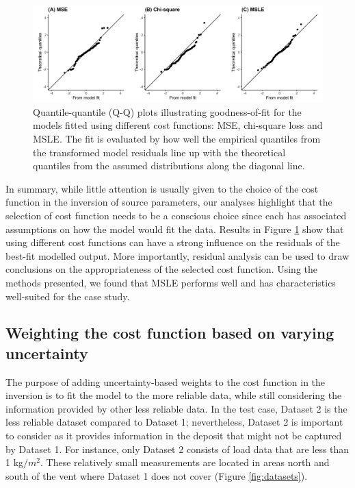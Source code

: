 \documentclass[a4paper,fleqn]{cas-sc}
\begin{document}
    \begin{figure}[tbp]
    \centering
    \includegraphics[width=\linewidth]{Figures/fig5_qq-plots.png}
    \caption{Quantile-quantile (Q-Q) plots illustrating goodness-of-fit for the models fitted using different cost functions: MSE, chi-square loss and MSLE. The fit is evaluated by how well the empirical quantiles from the transformed model residuals line up with the theoretical quantiles from the assumed distributions along the diagonal line.}
    \label{fig:gaussian_qq}
    \end{figure}

In summary, while little attention is usually given to the choice of the cost function in the inversion of source parameters, our analyses highlight that the selection of cost function needs to be a conscious choice since each has associated assumptions on how the model would fit the data. Results in Figure \ref{fig:gaussian_qq} show that using different cost functions can have a strong influence on the residuals of the best-fit modelled output. More importantly, residual analysis can be used to draw conclusions on the appropriateness of the selected cost function. Using the methods presented, we found that MSLE performs well and has characteristics well-suited for the case study. 

\subsection{Weighting the cost function based on varying uncertainty} \label{subsection-varuncert}

The purpose of adding uncertainty-based weights to the cost function in the inversion is to fit the model to the more reliable data, while still considering the information provided by other less reliable data. In the test case, Dataset 2 is the less reliable dataset compared to Dataset 1; nevertheless, Dataset 2 is important to consider as it provides information in the deposit that might not be captured by Dataset 1. For instance, only Dataset 2 consists of load data that are less than 1 kg$/m^{2}$. These relatively small measurements are located in areas north and south of the vent where Dataset 1 does not cover (Figure \ref{fig:datasets}). 
\end{document}
